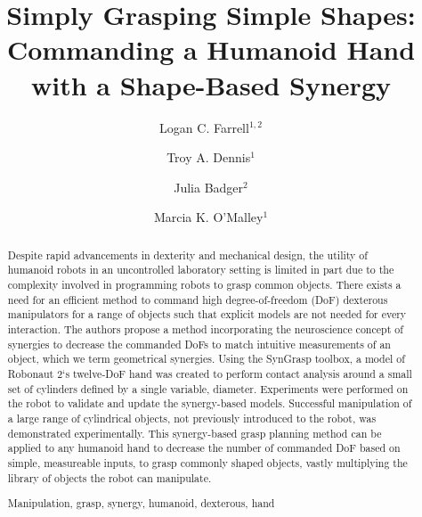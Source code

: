 \documentclass[runningheads,a4paper]{llncs}
\newcommand{\keywords}[1]{\par\addvspace\baselineskip
\noindent\keywordname\enspace\ignorespaces#1}
\begin{document}
\mainmatter  %

\title{Simply Grasping Simple Shapes:\\
Commanding a Humanoid Hand with a Shape-Based Synergy}


%
%
\author{Logan C. Farrell$^{1,2}$ %
\and Troy A. Dennis$^{1}$\and Julia Badger$^{2}$\and Marcia K. O'Malley$^{1}$}
%



%
%

\maketitle


\begin{abstract}
Despite rapid advancements in dexterity and mechanical design, the utility of humanoid robots in an uncontrolled laboratory setting is limited in part due to the complexity involved in programming robots to grasp common objects. There exists a need for an efficient method to command high degree-of-freedom (DoF) dexterous manipulators for a range of objects such that explicit models are not needed for every interaction. The authors propose a method incorporating the neuroscience concept of synergies to decrease the commanded DoFs to match intuitive measurements of an object, which we term geometrical synergies. Using the SynGrasp toolbox, a model of Robonaut 2`s twelve-DoF hand was created to perform contact analysis around a small set of cylinders defined by a single variable, diameter. Experiments were performed on the robot to validate and update the synergy-based models.  Successful manipulation of a large range of cylindrical objects, not previously introduced to the robot, was demonstrated experimentally. This synergy-based grasp planning method can be applied to any humanoid hand to decrease the number of commanded DoF based on simple, measureable inputs, to grasp commonly shaped objects, vastly multiplying the library of objects the robot can manipulate.
\keywords{Manipulation, grasp, synergy, humanoid, dexterous, hand}
\end{abstract}
\end{document}
